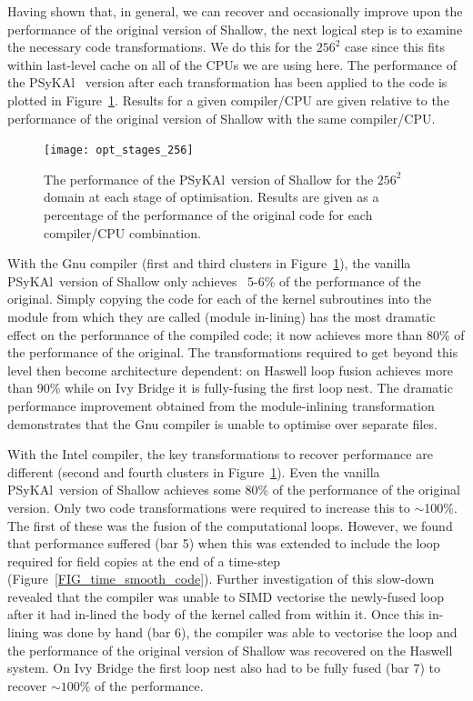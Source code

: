 \documentclass{IOS-Book-Article}
\newcommand{\psykal}{{PS}y{KA}l\ }
\begin{document}
Having shown that, in general, we can recover and occasionally improve
upon the performance of the original version of Shallow, the next
logical step is to examine the necessary code transformations.  We do
this for the $256^{2}$ case since this fits within last-level cache on
all of the CPUs we are using here.  The performance of the \psykal
version after each transformation has been applied to the code is
plotted in Figure~\ref{FIG_opt_stages_256}. Results for a given
compiler/CPU are given relative to the performance of the original
version of Shallow with the same compiler/CPU.

\begin{figure}[!t]
\centering
\texttt{[image: opt\_stages\_256]}
\caption{The performance of the \psykal version of Shallow for the
  $256^{2}$ domain at each stage of optimisation. Results are given as
  a percentage of the performance of the original code for each
  compiler/CPU combination.}
\label{FIG_opt_stages_256}
\end{figure}

With the Gnu compiler (first and third clusters in
Figure~\ref{FIG_opt_stages_256}), the vanilla \psykal version of
Shallow only achieves ~5-6\% of the performance of the
original. Simply copying the code for each of the kernel subroutines
into the module from which they are called (module in-lining) has the
most dramatic effect on the performance of the compiled code; it now
achieves more than 80\% of the performance of the original. The
transformations required to get beyond this level then become
architecture dependent: on Haswell loop fusion achieves more than 90\%
while on Ivy Bridge it is fully-fusing the first loop nest. The
dramatic performance improvement obtained from the module-inlining
transformation demonstrates that the Gnu compiler is unable to
optimise over separate files.

With the Intel compiler, the key transformations to recover
performance are different (second and fourth clusters in
Figure~\ref{FIG_opt_stages_256}).  Even the vanilla \psykal version of
Shallow achieves some 80\% of the performance of the original
version. Only two code transformations were required to increase this
to $\sim$100\%. The first of these was the fusion of the computational
loops. However, we found that performance suffered (bar 5) when this
was extended to include the loop required for field copies at the end
of a time-step (Figure~\ref{FIG_time_smooth_code}). Further
investigation of this slow-down revealed that the compiler was unable
to SIMD vectorise the newly-fused loop after it had in-lined the body
of the kernel called from within it. Once this in-lining was done by
hand (bar 6), the compiler was able to vectorise the loop and the
performance of the original version of Shallow was recovered on the
Haswell system. On Ivy Bridge the first loop nest also had to be fully
fused (bar 7) to recover $\sim100\%$ of the performance.
\end{document}
